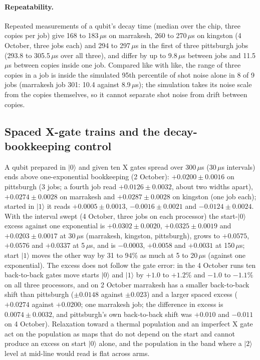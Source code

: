 \documentclass[reprint,amsmath,amssymb,aps,superscriptaddress,nofootinbib]{revtex4-2}
\newcommand{\us}{\,$\mu$s}
\begin{document}
\paragraph*{Repeatability.} Repeated measurements of a qubit's decay time (median over the chip, three copies per job) give 168 to 183\us{} on marrakesh, 260 to 270\us{} on kingston (4 October, three jobs each) and 294 to 297\us{} in the first of three pittsburgh jobs (293.8 to 305.5\us{} over all three), and differ by up to 9.8\us{} between jobs and 11.5\us{} between copies inside one job. Compared like with like, the range of three copies in a job is inside the simulated 95th percentile of shot noise alone in 8 of 9 jobs (marrakesh job 301: 10.4 against 8.9\us); the simulation takes its noise scale from the copies themselves, so it cannot separate shot noise from drift between copies.

\subsection{Spaced X-gate trains and the decay-bookkeeping control}\label{sec:xtrain}

A qubit prepared in $|0\rangle$ and given ten X gates spread over 300\us{} (30\us{} intervals) ends above one-exponential bookkeeping (2 October): $+0.0200\pm0.0016$ on pittsburgh (3 jobs; a fourth job read $+0.0126\pm0.0032$, about two widths apart), $+0.0274\pm0.0028$ on marrakesh and $+0.0287\pm0.0028$ on kingston (one job each); started in $|1\rangle$ it reads $+0.0005\pm0.0013$, $-0.0016\pm0.0021$ and $-0.0124\pm0.0024$. With the interval swept (4 October, three jobs on each processor) the start-$|0\rangle$ excess against one exponential is $+0.0302\pm0.0020$, $+0.0325\pm0.0019$ and $+0.0203\pm0.0017$ at 30\us{} (marrakesh, kingston, pittsburgh), grows to $+0.0575$, $+0.0576$ and $+0.0337$ at 5\us, and is $-0.0003$, $+0.0058$ and $+0.0031$ at 150\us; start $|1\rangle$ moves the other way by 31 to 94\% as much at 5 to 20\us{} (against one exponential). The excess does not follow the gate error: in the 4 October runs ten back-to-back gates move starts $|0\rangle$ and $|1\rangle$ by $+1.0$ to $+1.2\%$ and $-1.0$ to $-1.1\%$ on all three processors, and on 2 October marrakesh has a smaller back-to-back shift than pittsburgh ($\pm0.0148$ against $\pm0.023$) and a larger spaced excess ($+0.0274$ against $+0.0200$; one marrakesh job; the difference in excess is $0.0074\pm0.0032$, and pittsburgh's own back-to-back shift was $+0.010$ and $-0.011$ on 4 October). Relaxation toward a thermal population and an imperfect X gate act on the population as maps that do not depend on the start and cannot produce an excess on start $|0\rangle$ alone, and the population in the band where a $|2\rangle$ level at mid-line would read is flat across arms.
\end{document}
